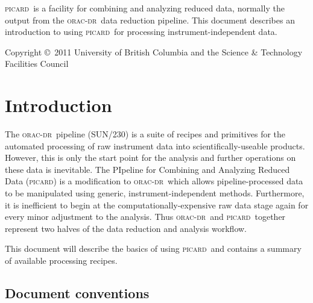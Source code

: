 \documentclass[twoside,11pt]{article}
\newcommand{\stardocinitials}  {SUN}
\newcommand{\stardoccopyright}
{Copyright \copyright\ 2011 University of British Columbia and the Science \& Technology Facilities Council}
\newcommand{\stardocnumber}    {265.0}
\newcommand{\stardocabstract}  {

  \picard\ is a facility for combining and analyzing reduced data,
  normally the output from the \oracdr\ data reduction pipeline. This
  document describes an introduction to using \picard\ for processing
  instrument-independent data.

}
\newcommand{\stardocname}{\stardocinitials /\stardocnumber}
\newenvironment{latexonly}{}{}
\newcommand{\xref}[3]{#1}
\newcommand{\xlabel}[1]{}
\renewcommand{\_}{\texttt{\symbol{95}}}
\newcommand{\oracdr}{\textsc{orac-dr}}
\newcommand{\oracsun}{\xref{SUN/230}{sun230}{}}
\newcommand{\picard}{\textsc{picard}}
\renewcommand{\thepage}{\roman{page}}
\begin{document}
\stardocabstract

\begin{latexonly}
\newpage
\vspace*{\fill}
\stardoccopyright
\end{latexonly}

  \newpage
  \begin{latexonly}
    \setlength{\parskip}{0mm}
    \tableofcontents
    \setlength{\parskip}{\medskipamount}
    \markboth{\stardocname}{\stardocname}
  \end{latexonly}

\cleardoublepage
\renewcommand{\thepage}{\arabic{page}}
\setcounter{page}{1}


\section{\xlabel{introduction}Introduction\label{se:intro}}

The \oracdr\ pipeline (\oracsun) is a suite of recipes and primitives
for the automated processing of raw instrument data into
scientifically-useable products. However, this is only the start point
for the analysis and further operations on these data is
inevitable. The PIpeline for Combining and Analyzing Reduced Data
(\picard) is a modification to \oracdr\ which allows
pipeline-processed data to be manipulated using generic,
instrument-independent methods. Furthermore, it is inefficient to
begin at the computationally-expensive raw data stage again for every
minor adjustment to the analysis. Thus \oracdr\ and \picard\ together
represent two halves of the data reduction and analysis workflow.

This document will describe the basics of using \picard\ and contains
a summary of available processing recipes.

\subsection{Document conventions}
\end{document}
